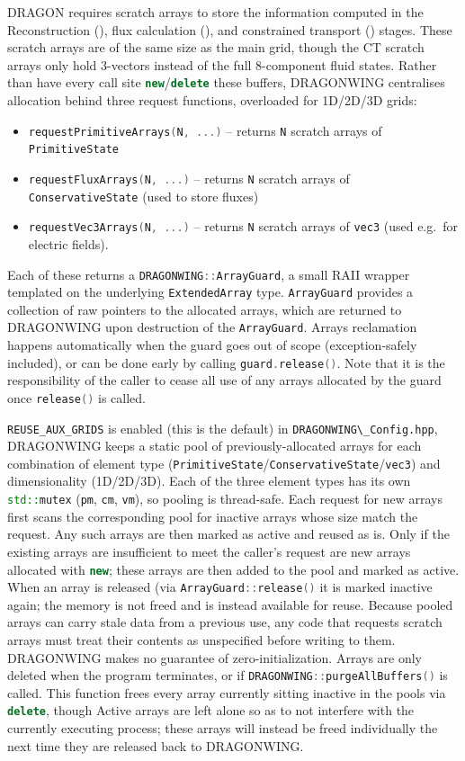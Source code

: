 \documentclass[11pt]{report}
\newcommand{\cpp}[1]{\lstinline[language=C++]{#1}}
\newcommand{\bash}[1]{\lstinline[language=bash]{#1}}
\begin{document}
DRAGON requires scratch arrays to store the information computed in the Reconstruction (), flux calculation (), and constrained transport () stages. These scratch arrays are of the same size as the main grid, though the CT scratch arrays only hold 3-vectors instead of the full 8-component fluid states.
Rather than have every call site \cpp{new}/\cpp{delete} these buffers, DRAGONWING centralises allocation behind three request functions, overloaded for 1D/2D/3D grids:
\begin{itemize}
\item \cpp{requestPrimitiveArrays(N, ...)} -- returns \cpp{N} scratch arrays of \cpp{PrimitiveState}
\item \cpp{requestFluxArrays(N, ...)} -- returns \cpp{N} scratch arrays of \cpp{ConservativeState} (used to store fluxes)
\item \cpp{requestVec3Arrays(N, ...)} -- returns \cpp{N} scratch arrays of \cpp{vec3} (used e.g.\ for electric fields).
\end{itemize}
Each of these returns a \cpp{DRAGONWING::ArrayGuard}, a small RAII wrapper templated on the underlying \cpp{ExtendedArray} type.
\cpp{ArrayGuard} provides a collection of raw pointers to the allocated arrays, which are returned to DRAGONWING upon destruction of the \cpp{ArrayGuard}.   
Arrays reclamation happens automatically when the guard goes out of scope (exception-safely included), or can be done early by calling \cpp{guard.release()}. Note that it is the responsibility of the caller to cease all use of any arrays allocated by the guard once \cpp{release()} is called.


 \cpp{REUSE_AUX_GRIDS} is enabled (this is the default) in \bash{DRAGONWING\_Config.hpp}, DRAGONWING keeps a static pool of previously-allocated arrays for each combination of element type (\cpp{PrimitiveState}/\cpp{ConservativeState}/\cpp{vec3}) and dimensionality (1D/2D/3D).  Each of the three element types has its own \cpp{std::mutex} (\cpp{pm}, \cpp{cm}, \cpp{vm}), so pooling is thread-safe.
Each request for new arrays first scans the corresponding pool for inactive arrays whose size match the request. 
Any such arrays are then marked as active and reused as is.
Only if the existing arrays are insufficient to meet the caller's request are new arrays allocated with \cpp{new}; these arrays are then added to the pool and marked as active.
When an array is released (via \cpp{ArrayGuard::release()} it is marked inactive again; the memory is not freed and is instead available for reuse.
 Because pooled arrays can carry stale data from a previous use, any code that requests scratch arrays must treat their contents as unspecified before writing to them. DRAGONWING makes no guarantee of zero-initialization.
 Arrays are only deleted when the program terminates, or if \cpp{DRAGONWING::purgeAllBuffers()} is called. This function frees every array currently sitting inactive in the pools via \cpp{delete}, though Active arrays are left alone so as to not interfere with the currently executing process; these arrays will instead be freed individually the next time they are released back to DRAGONWING. 
\end{document}
